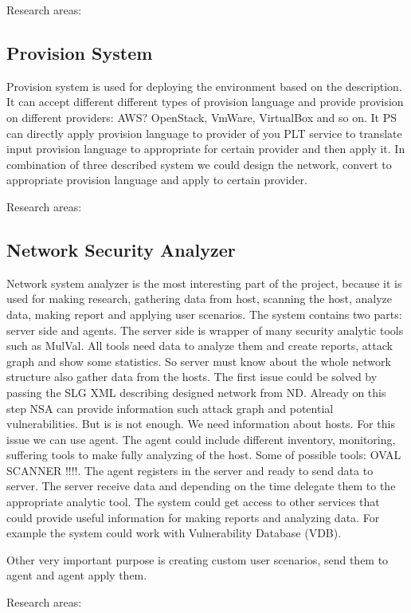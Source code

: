 \documentclass[twoside]{article}
\newcommand{\myPS}{Provision System}
\newcommand{\myNSA}{Network Security Analyzer}
\begin{document}
     
Research areas:     

\subsection{\myPS}
Provision system is used for deploying the environment based on the description. It can accept different different types of provision language and provide provision on different providers: AWS? OpenStack, VmWare, VirtualBox and so on. It PS can directly apply provision language to provider of you PLT service to translate input provision language to appropriate for certain provider and then apply it. In combination of three described system we could design the network, convert to appropriate provision language and apply to certain provider. 

Research areas:


\subsection{\myNSA}
Network system analyzer is the most interesting part of the project, because it is used for making research, gathering data from host, scanning the host, analyze data, making report and applying user scenarios. The system contains two parts: server side and agents. The server side is wrapper of many security analytic tools such as MulVal. All tools need data to analyze them and create reports, attack graph and show some statistics. So server must  know about the whole network structure also gather data from the hosts. The first issue could be solved by passing the SLG XML describing designed network from ND. Already on this step NSA can provide information such attack graph and potential vulnerabilities. But is is not enough. We need information about hosts. For this issue we can use agent. The agent could include different inventory, monitoring, suffering tools to make fully analyzing of the host. Some of possible tools: OVAL SCANNER !!!!. The agent registers in the server and ready to send data to server. The server receive data and depending on the time delegate them to the appropriate analytic tool. The system could get access to other services that could provide useful information for making reports and analyzing data. For example the system could work with Vulnerability Database (VDB). 

Other very important purpose is creating custom user scenarios, send them to agent and agent apply them.     


Research areas:
\end{document}

